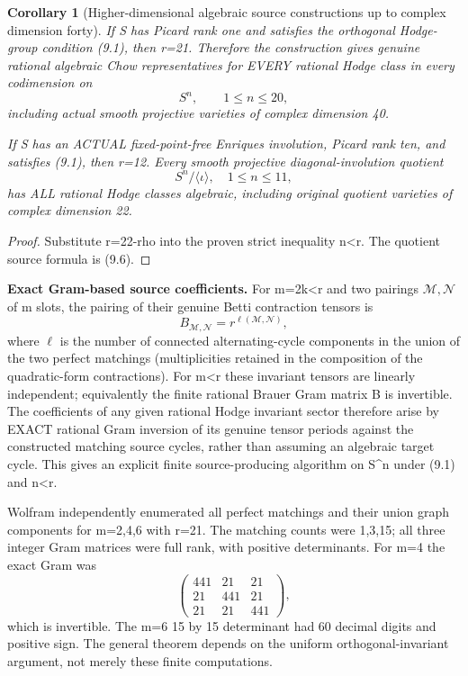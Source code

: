 \documentclass[11pt]{article}
\newtheorem{corollary}[theorem]{Corollary}
\begin{document}
\begin{corollary}[Higher-dimensional algebraic source constructions up to complex dimension forty]
If S has Picard rank one and satisfies
the orthogonal Hodge-group condition
(9.1), then r=21. Therefore the
construction gives genuine rational
algebraic Chow representatives for
EVERY rational Hodge class in every
codimension on
\[
      \boxed{S^n,\qquad 1\le n\le20,}
                                                               \tag{9.7}
\]
including actual smooth projective
varieties of complex dimension 40.

If S has an ACTUAL fixed-point-free
Enriques involution, Picard rank ten,
and satisfies (9.1), then r=12.
Every smooth projective diagonal-involution
quotient
\[
 \boxed{S^n/\langle\iota\rangle,\quad
                   1\le n\le11,}                  \tag{9.8}
\]
has ALL rational Hodge classes algebraic,
including original quotient varieties
of complex dimension 22.
\end{corollary}
\begin{proof}
Substitute r=22-rho into the proven
strict inequality n<r. The quotient
source formula is (9.6).
\end{proof}

\noindent\textbf{Exact Gram-based source coefficients.}
For m=2k<r and two pairings
\(\mathcal M,\mathcal N\) of m slots,
the pairing of their genuine
Betti contraction tensors is
\[
 \boxed{
 B_{\mathcal M,\mathcal N}
    =r^{\ell(\mathcal M,\mathcal N)},}               \tag{9.9}
\]
where \(\ell\) is the number of
connected alternating-cycle components
in the union of the two perfect matchings
(multiplicities retained in the
composition of the quadratic-form
contractions). For m<r these
invariant tensors are linearly
independent; equivalently the finite
rational Brauer Gram matrix B is
invertible. The coefficients of any
given rational Hodge invariant
sector therefore arise by EXACT rational
Gram inversion of its genuine tensor
periods against the constructed
matching source cycles, rather
than assuming an algebraic target cycle.
This gives an explicit finite
source-producing algorithm on S^n
under (9.1) and n<r.

Wolfram independently enumerated all
perfect matchings and their union graph
components for m=2,4,6 with r=21.
The matching counts were 1,3,15;
all three integer Gram matrices were
full rank, with positive determinants.
For m=4 the exact Gram was
\[
 \begin{pmatrix}
 441&21&21\\21&441&21\\21&21&441
 \end{pmatrix},
\]
which is invertible. The m=6
15 by 15 determinant had 60
decimal digits and positive sign.
The general theorem depends on the
uniform orthogonal-invariant argument,
not merely these finite computations.
\end{document}
